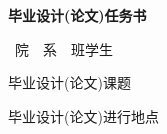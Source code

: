 \documentclass{xjtubsc}
\begin{document}
\frontmatter





\parindent=0pt
\renewcommand{\baselinestretch}{1.6}\selectfont


\begin{center}\bfseries\huge %
毕业设计(论文)任务书 %
\vspace{1em}

\end{center}

\par{}~院~~系~~班\hspace{\ccwd}学生

\par 毕业设计(论文)课题\hspace{1ex}


\par 毕业设计(论文)进行地点\hspace{1ex}








\end{document}
